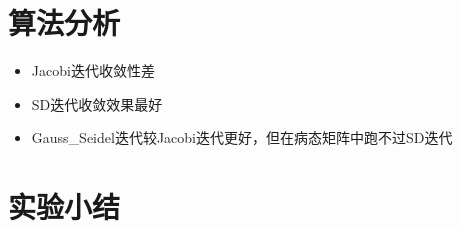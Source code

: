 \documentclass[12pt]{article}
\begin{document}
\section{算法分析}
\begin{itemize}
    \item Jacobi迭代收敛性差
    \item SD迭代收敛效果最好
    \item Gauss\_Seidel迭代较Jacobi迭代更好，但在病态矩阵中跑不过SD迭代
\end{itemize}


\section{实验小结}
\end{document}
